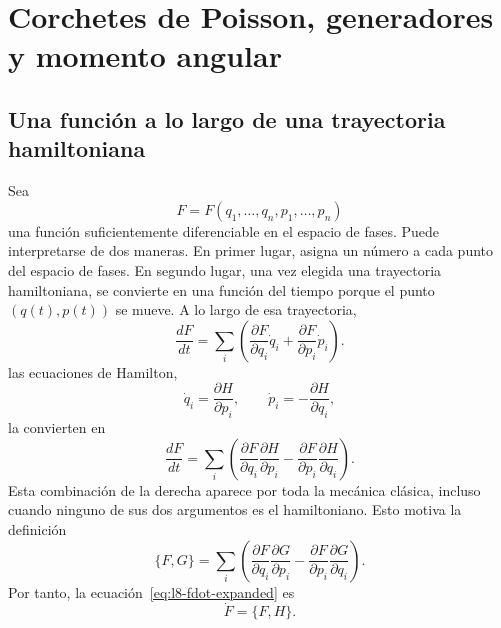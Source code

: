 \chapter{Corchetes de Poisson, generadores y momento angular}


\section{Una función a lo largo de una trayectoria hamiltoniana}

Sea
\[
  F=F(q_1,\ldots,q_n,p_1,\ldots,p_n)
\]
una función suficientemente diferenciable en el espacio de fases. Puede interpretarse de dos maneras. En primer lugar, asigna un número a cada punto del espacio de fases. En segundo lugar, una vez elegida una trayectoria hamiltoniana, se convierte en una función del tiempo porque el punto \((q(t),p(t))\) se mueve. A lo largo de esa trayectoria,
\begin{equation}
  \frac{dF}{dt}
  =
  \sum_i\left(
    \frac{\partial F}{\partial q_i}\dot q_i
    +\frac{\partial F}{\partial p_i}\dot p_i
  \right).
  \label{eq:l8-chain-rule}
\end{equation}
las ecuaciones de Hamilton,
\begin{equation}
  \dot q_i=\frac{\partial H}{\partial p_i},
  \qquad
  \dot p_i=-\frac{\partial H}{\partial q_i},
  \label{eq:l8-hamilton-equations}
\end{equation}
la convierten en
\begin{equation}
  \frac{dF}{dt}
  =
  \sum_i\left(
    \frac{\partial F}{\partial q_i}
    \frac{\partial H}{\partial p_i}
    -
    \frac{\partial F}{\partial p_i}
    \frac{\partial H}{\partial q_i}
  \right).
  \label{eq:l8-fdot-expanded}
\end{equation}
Esta combinación de la derecha aparece por toda la mecánica clásica, incluso cuando ninguno de sus dos argumentos es el hamiltoniano. Esto motiva la definición
\begin{equation}
  \boxed{
  \{F,G\}
  =
  \sum_i\left(
    \frac{\partial F}{\partial q_i}
    \frac{\partial G}{\partial p_i}
    -
    \frac{\partial F}{\partial p_i}
    \frac{\partial G}{\partial q_i}
  \right).}
  \label{eq:l8-poisson-definition}
\end{equation}
Por tanto, la ecuación~\eqref{eq:l8-fdot-expanded} es
\begin{equation}
  \boxed{\dot F=\{F,H\}.}
  \label{eq:l8-time-generator}
\end{equation}

